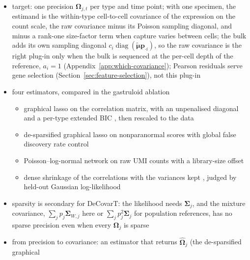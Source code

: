 \documentclass[pdflatex, sn-nature]{sn-jnl}
\theoremstyle{thmstyleone}%
\theoremstyle{thmstyletwo}%
\theoremstyle{thmstylethree}%
\begin{document}
\begin{itemize}
  \item target: one precision \(\boldsymbol{\Omega}_{j,t}\) per type and time point; with one specimen, the
        estimand is the within-type cell-to-cell covariance of the expression on the count scale, the raw
        covariance minus its Poisson sampling diagonal, and minus a rank-one size-factor term when capture varies
        between cells; the bulk adds its own sampling diagonal \(c_{i}\operatorname{diag}(\tilde{\boldsymbol{\mu}}\boldsymbol{p}_{\cdot i})\),
        so the raw covariance is the right plug-in only when the bulk is sequenced at the per-cell depth of the
        reference, \(a_{i}=1\) (Appendix~\ref{app:which-covariance}); Pearson
        residuals serve gene selection (Section~\ref{sec:feature-selection}), not this plug-in
  \item four estimators, compared in the gastruloid ablation
  \begin{itemize}
    \item graphical lasso \cite{friedmanSparseInverseCovariance2008} on the correlation matrix, with an
          unpenalised diagonal and a per-type extended BIC \cite{foygelExtendedBayesianInformation2010}, then
          rescaled to the data
    \item de-sparsified graphical lasso on nonparanormal scores with global false discovery rate control
          \cite{jankovaConfidenceIntervalsHighdimensional2015,liuNonparanormalSemiparametricEstimation2009,liuGaussianGraphicalModel2013,zhangSILGGMExtensivePackage2018}
    \item Poisson--log-normal network on raw UMI counts with a library-size offset
          \cite{chiquetVariationalInferenceSparse2018}
    \item dense shrinkage of the correlations with the variances kept
          \cite{schäferShrinkageApproachLargescale2005}, judged by held-out Gaussian log-likelihood
  \end{itemize}
  \item sparsity is secondary for DeCovarT: the likelihood needs \(\boldsymbol{\Sigma}_{j}\), and the mixture covariance,
        \(\sum_{j}p_{j}\boldsymbol{\Sigma}_{W,j}\) here or \(\sum_{j}p_{j}^{2}\boldsymbol{\Sigma}_{j}\) for population references, has no
        sparse precision even when every \(\boldsymbol{\Omega}_{j}\) is sparse
  \item from precision to covariance: an estimator that returns \(\hat{\boldsymbol{\Omega}}_{j}\) (the de-sparsified graphical

\end{itemize}
\end{document}
